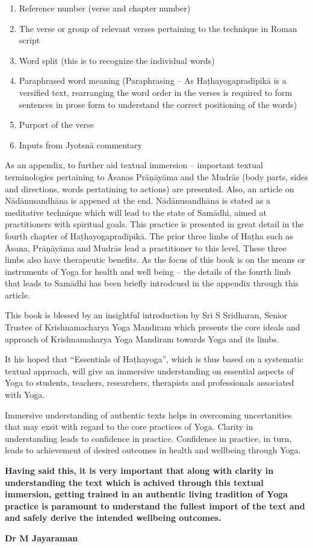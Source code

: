 \begin{enumerate}
\item Reference number (verse and chapter number)
\item The verse or group of relevant verses pertaining to the technique in Roman script 
\item Word split (this is to recognize the individual words)
\item Paraphrased word meaning (Paraphrasing – As Haṭha\-yoga\-pra\-dīpikā is a versified text, rearranging the word order in the verses is required to form sentences in prose form to understand the correct positioning of the words)
\item Purport of the verse 
\item Inputs from Jyotsnā commentary
\end{enumerate}

As an appendix, to further aid textual immersion – important textual terminologies pertaining to Āsanas Prāṇāyāma and the Mudrās (body parts, sides and directions, words pertatining to actions) are presented. Also, an article on Nādānusandhāna is appened at the end. Nādānusandhāna is stated as a meditative technique which will lead to the state of Samādhi, aimed at practitioners with spiritual goals. This practice is presented in great detail in the fourth chapter of Haṭhayogapradīpikā. The prior three limbs of Haṭha such as Āsana, Prāṇāyāma and Mudrās lead a practitioner to this level. These three limbs also have therapeutic benefits. As the focus of this book is on the means or instruments of Yoga for health and well being – the details of the fourth limb that leads to Samādhi has been briefly introdcued in the appendix through this article.

This book is blessed by an insightful introduction by Sri S Sridharan, Senior Trustee of Krishnamacharya Yoga Mandiram which presents the core ideals and approach of Krishnamaharya Yoga Mandiram towards Yoga and its limbs.

It his hoped that “Essentials of Haṭhayoga”, which is thus based on a systematic textual approach, will give an immersive understanding on essential aspects of Yoga to students, teachers, researchers, therapists and professionals associated with Yoga.

Immersive understanding of authentic texts helps in overcoming uncertanities that may exsit with regard to the core practices of Yoga. Clarity in understanding leads to confidence in practice. Confidence in practice, in turn, leads to achievement of desired outcomes in health and wellbeing through Yoga. 

\textbf{Having said this, it is very important that along with clarity in understanding the text which is achived through this textual immersion, getting trained in an authentic living tradition of Yoga practice is paramount to understand the fullest import of the text and and safely derive the intended wellbeing outcomes.}
\vspace{1cm}

\begin{flushright}
\textbf{Dr M Jayaraman}
\end{flushright}
